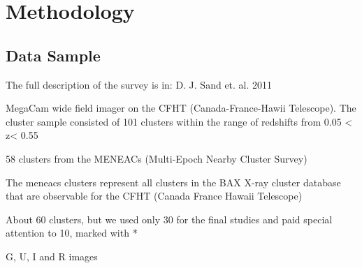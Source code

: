 
\chapter{Methodology}

\section{Data Sample}

The full description of the survey is in: D. J. Sand et. al. 2011

MegaCam wide field imager on the CFHT (Canada-France-Hawii Telescope). The cluster sample consisted of 101 clusters within the range of redshifts from 0.05 < z< 0.55

58 clusters from the MENEACs (Multi-Epoch Nearby Cluster Survey)

The meneacs clusters represent all clusters in the BAX X-ray cluster database that are observable for the CFHT (Canada France Hawaii Telescope)

About 60 clusters, but we used only 30 for the final studies and paid special attention to 10, marked with *

G, U, I and R images

